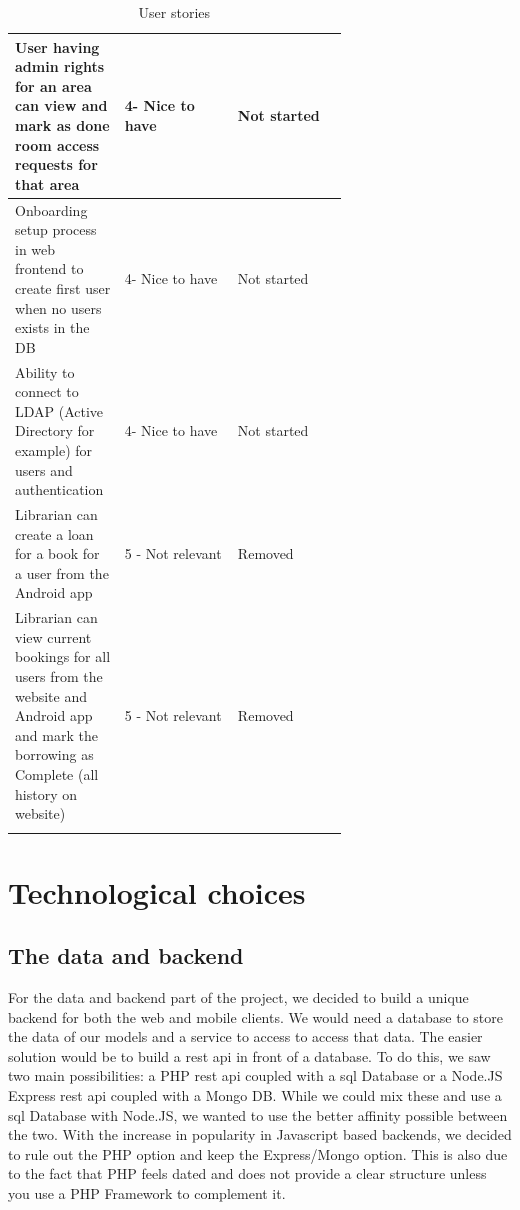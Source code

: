 \documentclass[twoside, openright,11pt,a4paper]{book}
\begin{document}
\begin{longtable}[c]{|p{0.33\linewidth}|l|p{0.33\linewidth}|}
User having admin rights for an area can view and mark as done room access requests for that area                                              & 4- Nice to have   & Not started                                      \\ \hline
Onboarding setup process in web frontend to create first user when no users exists in the DB                                                   & 4- Nice to have   & Not started                                      \\ \hline
Ability to connect to LDAP (Active Directory for example) for users and authentication                                                         & 4- Nice to have   & Not started                                      \\ \hline
Librarian can create a loan for a book for a user from the Android app                                                                         & 5 - Not relevant  & Removed                                          \\ \hline
Librarian can view current bookings for all users from the website and Android app and mark the borrowing as Complete (all history on website) & 5 - Not relevant  & Removed                                          \\ \hline
\caption{User stories}
\label{user_stories_table}\\
\end{longtable}


\section{Technological choices}
\label{technological choices}
\subsection{The data and backend}
For the data and backend part of the project, we decided to build a unique backend for both the web and mobile clients. We would need a database to store the data of our models and a service to access to access that data. The easier solution would be to build a \gls{rest} \gls{api} in front of a database. To do this, we saw two main possibilities: a PHP \gls{rest} \gls{api} coupled with a \gls{sql} Database or a Node.JS Express \gls{rest} \gls{api} coupled with a Mongo DB. While we could mix these and use a \gls{sql} Database with Node.JS, we wanted to use the better affinity possible between the two. With the increase in popularity in Javascript based backends, we decided to rule out the PHP option and keep the Express/Mongo option. This is also due to the fact that PHP feels dated and does not provide a clear structure unless you use a PHP Framework to complement it. \\
\end{document}
